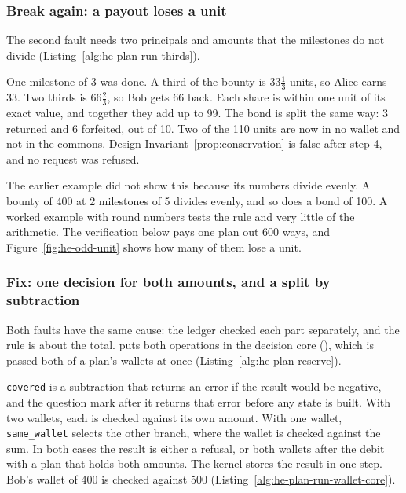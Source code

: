 \subsubsection{Break again: a payout loses a unit}

The second fault needs two principals and amounts that the milestones do
not divide (Listing~\ref{alg:he-plan-run-thirds}).


One milestone of 3 was done. A third of the bounty is $33\tfrac13$ units,
so Alice earns 33. Two thirds is $66\tfrac23$, so Bob gets 66 back. Each
share is within one unit of its exact value, and together they add up to
99. The bond is split the same way: 3 returned and 6 forfeited, out of 10.
Two of the 110 units are now in no wallet and not in the commons. Design
Invariant~\ref{prop:conservation} is false after step 4, and no request
was refused.

The earlier example did not show this because its numbers divide evenly.
A bounty of 400 at 2 milestones of 5 divides evenly, and so does a bond of
100. A worked example with round numbers tests the rule and very little
of the arithmetic. The verification below pays one plan out 600 ways, and
Figure~\ref{fig:he-odd-unit} shows how many of them lose a unit.

\subsubsection{Fix: one decision for both amounts, and a split by subtraction}

Both faults have the same cause: the ledger checked each part separately,
and the rule is about the total. \pdkernelname{} puts both operations in
the decision core (), which
is passed both of a plan's wallets at once
(Listing~\ref{alg:he-plan-reserve}).


\texttt{covered} is a subtraction that returns an error if the result
would be negative, and the question mark after it returns that error
before any state is built. With two wallets, each is checked against its
own amount. With one wallet, \texttt{same\_wallet} selects the other
branch, where the wallet is checked against the sum. In both cases the
result is either a refusal, or both wallets after the debit with a plan
that holds both amounts. The kernel stores the result in one step. Bob's
wallet of 400 is checked against 500
(Listing~\ref{alg:he-plan-run-wallet-core}).

